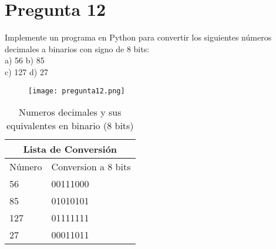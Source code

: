 \documentclass[10pt]{beamer}
\begin{document}
\section{Pregunta 12}

\lstset{style=mystyle}

\vspace*{\fill}
Implemente un programa en Python para convertir los siguientes números decimales a binarios con signo de 8 bits:\\ 
\centering
a) 56 \quad \quad \quad
b) 85 \\
c) 127 \quad \quad \quad
d) 27


\vspace*{\fill}
%

\newpage

\begin{figure}{}
    \centering
    \texttt{[image: pregunta12.png]}
    \label{fig:Método Aitken}

\end{figure}

\newpage
\begin{table}

\vspace*{\fill}

\centering
\begin{tabular}{ | p{3cm} |p{3cm} | }

\hline
\multicolumn{2}{|c|}{Lista de Conversión} \\
\hline
Número & Conversion a 8 bits  \\
\hline
56 & 00111000  \\
85 & 01010101    \\
127 & 01111111  \\
27    & 00011011  \\
\hline
\end{tabular}
\caption{Numeros decimales y sus equivalentes en binario (8 bits) }


\vspace*{\fill}
%

\end{table}
\end{document}
